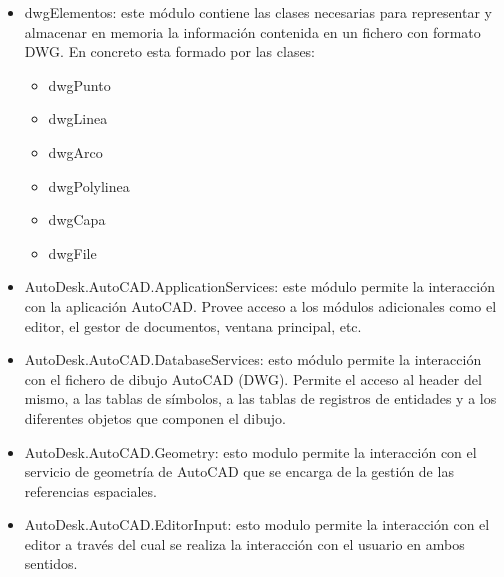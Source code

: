 \begin{itemize}

\item{dwgElementos: este módulo contiene las clases necesarias para representar y almacenar en memoria la información contenida en un fichero con formato DWG. En concreto esta formado por las clases:}

\begin{itemize}

\item{dwgPunto}
\item{dwgLinea}
\item{dwgArco}
\item{dwgPolylinea}
\item{dwgCapa}
\item{dwgFile}

\end{itemize}

\item{AutoDesk.AutoCAD.ApplicationServices: este módulo permite la interacción con la aplicación AutoCAD. Provee acceso a los módulos adicionales como el editor, el gestor de documentos, ventana principal, etc.}

\item{AutoDesk.AutoCAD.DatabaseServices: esto módulo permite la interacción con el fichero de dibujo AutoCAD (DWG). Permite el acceso al header del mismo, a las tablas de símbolos, a las tablas de registros de entidades y a los diferentes objetos que componen el dibujo.}

\item{AutoDesk.AutoCAD.Geometry: esto modulo permite la interacción con el servicio de geometría de AutoCAD que se encarga de la gestión de las referencias espaciales.}

\item{AutoDesk.AutoCAD.EditorInput: esto modulo permite la interacción con el editor a través del cual se realiza la interacción con el usuario en ambos sentidos.}

\end{itemize}
